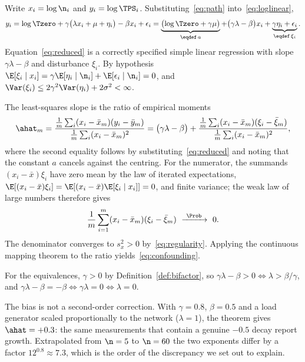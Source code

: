 \begin{Proof}
Write $x_{i}=\log\n_{i}$ and $y_{i}=\log\TPS_{i}$. Substituting~\eqref{eq:path}
into~\eqref{eq:loglinear},
\begin{equation}
y_{i}
=\log\Tzero+\gamma\bigl(\lambda x_{i}+\mu+\eta_{i}\bigr)-\beta x_{i}+\epsilon_{i}
=\underbrace{\bigl(\log\Tzero+\gamma\mu\bigr)}_{\eqdef\,a}
+\bigl(\gamma\lambda-\beta\bigr)x_{i}
+\underbrace{\gamma\eta_{i}+\epsilon_{i}}_{\eqdef\,\xi_{i}} .
\label{eq:reduced}
\end{equation}
Equation~\eqref{eq:reduced} is a correctly specified simple linear regression
with slope $\gamma\lambda-\beta$ and disturbance $\xi_{i}$. By hypothesis
$\E[\xi_{i}\mid x_{i}]=\gamma\E[\eta_{i}\mid\n_{i}]+\E[\epsilon_{i}\mid\n_{i}]=0$,
and $\Var(\xi_{i})\le2\gamma^{2}\Var(\eta_{i})+2\sigma^{2}<\infty$.

The least-squares slope is the ratio of empirical moments
\begin{equation*}
\ahat_{m}
=\frac{\frac{1}{m}\sum_{i}(x_{i}-\bar{x}_{m})(y_{i}-\bar{y}_{m})}
      {\frac{1}{m}\sum_{i}(x_{i}-\bar{x}_{m})^{2}}
=\bigl(\gamma\lambda-\beta\bigr)
+\frac{\frac{1}{m}\sum_{i}(x_{i}-\bar{x}_{m})(\xi_{i}-\bar{\xi}_{m})}
      {\frac{1}{m}\sum_{i}(x_{i}-\bar{x}_{m})^{2}} ,
\end{equation*}
where the second equality follows by substituting~\eqref{eq:reduced} and noting
that the constant $a$ cancels against the centring. For the numerator, the
summands $(x_{i}-\bar{x})\xi_{i}$ have zero mean by the law of iterated
expectations, $\E[(x_{i}-\bar{x})\xi_{i}]=\E[(x_{i}-\bar{x})\E[\xi_{i}\mid x_{i}]]=0$,
and finite variance; the weak law of large numbers therefore gives
\begin{equation*}
\frac{1}{m}\sum_{i=1}^{m}(x_{i}-\bar{x}_{m})(\xi_{i}-\bar{\xi}_{m})
\ \xrightarrow{\ \Prob\ }\ 0 .
\end{equation*}
The denominator converges to $s_{x}^{2}>0$ by~\eqref{eq:regularity}. Applying
the continuous mapping theorem to the ratio yields~\eqref{eq:confounding}.

For the equivalences, $\gamma>0$ by Definition~\ref{def:bifactor}, so
$\gamma\lambda-\beta>0\iff\lambda>\beta/\gamma$, and
$\gamma\lambda-\beta=-\beta\iff\gamma\lambda=0\iff\lambda=0$.
\end{Proof}

\begin{Remark}
The bias is not a second-order correction. With $\gamma=0.8$, $\beta=0.5$ and a
load generator scaled proportionally to the network ($\lambda=1$), the theorem
gives $\ahat=+0.3$: the same measurements that contain a genuine $-0.5$ decay
report growth. Extrapolated from $\n=5$ to $\n=60$ the two exponents differ by
a factor $12^{0.8}\approx7.3$, which is the order of the discrepancy we set out
to explain.
\end{Remark}

